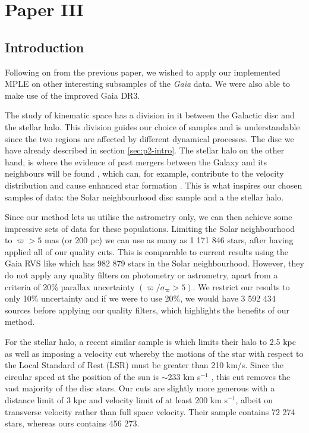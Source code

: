 \chapter{Paper III}\label{chap:paper3}
\section{Introduction}\label{sec:p3-intro}
Following on from the previous paper, we wished to apply our implemented MPLE on other interesting subsamples of the \textit{Gaia} data. We were also able to make use of the improved Gaia DR3. 

The study of kinematic space has a division in it between the Galactic disc and the stellar halo. This division guides our choice of samples and is understandable since the two regions are affected by different dynamical processes. The disc we have already described in section \ref{sec:p2-intro}. The stellar halo on the other hand, is where the evidence of past mergers between the Galaxy and its neighbours will be found \citep{helmi:20}, which can, for example, contribute to the velocity distribution and cause enhanced star formation \citep{ruiz-lara:20}. This is what inspires our chosen samples of data: the Solar neighbourhood disc sample and a the stellar halo.

Since our method lets us utilise the astrometry only, we can then achieve some impressive sets of data for these populations. Limiting the Solar neighbourhood to $\varpi > 5$ mas (or 200 pc) we can use as many as 1 171 846 stars, after having applied all of our quality cuts. This is comparable to current results using the Gaia RVS like \cite{lucchini:22} which has 982 879 stars in the Solar neighbourhood. However, they do not apply any quality filters on photometry or astrometry, apart from a criteria of 20\% parallax uncertainty $(\varpi / \sigma_\varpi > 5)$. We restrict our results to only 10\% uncertainty and if we were to use 20\%, we would have 3 592 434 sources before applying our quality filters, which highlights the benefits of our method.

For the stellar halo, a recent similar sample is \cite{dodd:22} which limits their halo to 2.5 kpc as well as imposing a velocity cut whereby the motions of the star with respect to the Local Standard of Rest (LSR) must be greater than 210 km/s. Since the circular speed at the position of the sun is ${\sim}$233 km s$^{-1}$ \citep{mcmillan:17}, this cut removes the vast majority of the disc stars. Our cuts are slightly more generous with a distance limit of 3 kpc and velocity limit of at least 200 km s$^{-1}$, albeit on transverse velocity rather than full space velocity. Their sample contains 72 274 stars, whereas ours contains 456 273. 

